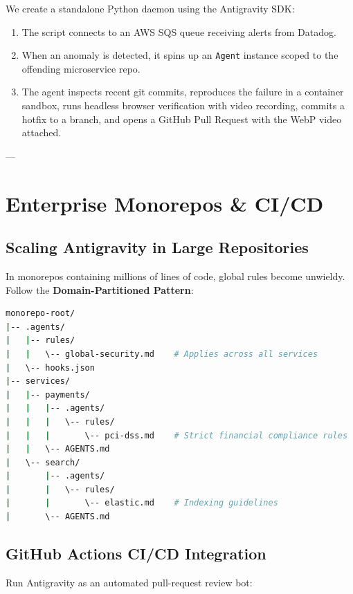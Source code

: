 \documentclass[11pt,a4paper,oneside]{book}
\begin{document}
\begin{labbox}
We create a standalone Python daemon using the Antigravity SDK:
\begin{enumerate}
    \item The script connects to an AWS SQS queue receiving alerts from Datadog.
    \item When an anomaly is detected, it spins up an \texttt{Agent} instance scoped to the offending microservice repo.
    \item The agent inspects recent git commits, reproduces the failure in a container sandbox, runs headless browser verification with video recording, commits a hotfix to a branch, and opens a GitHub Pull Request with the WebP video attached.
\end{enumerate}
\end{labbox}

---

\chapter{Enterprise Monorepos \& CI/CD}

\section{Scaling Antigravity in Large Repositories}
In monorepos containing millions of lines of code, global rules become unwieldy. Follow the \textbf{Domain-Partitioned Pattern}:

\begin{lstlisting}[language=bash, caption={Monorepo directory layout for Antigravity}]
monorepo-root/
|-- .agents/
|   |-- rules/
|   |   \-- global-security.md    # Applies across all services
|   \-- hooks.json
|-- services/
|   |-- payments/
|   |   |-- .agents/
|   |   |   \-- rules/
|   |   |       \-- pci-dss.md    # Strict financial compliance rules
|   |   \-- AGENTS.md
|   \-- search/
|       |-- .agents/
|       |   \-- rules/
|       |       \-- elastic.md    # Indexing guidelines
|       \-- AGENTS.md
\end{lstlisting}

\section{GitHub Actions CI/CD Integration}
Run Antigravity as an automated pull-request review bot:
\end{document}
